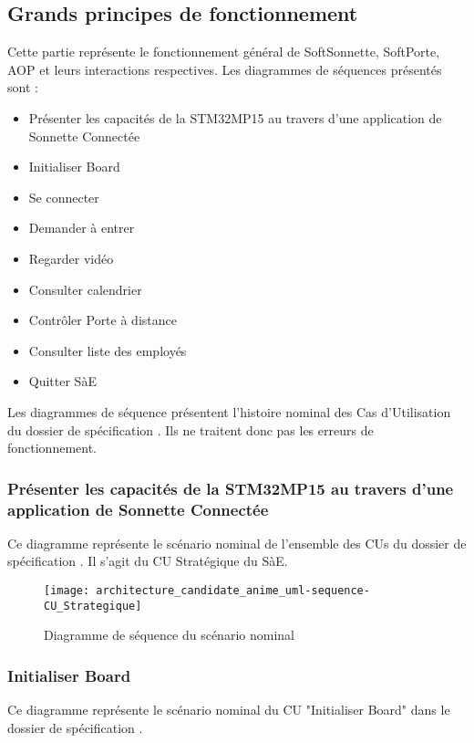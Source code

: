 \newpage

\subsection{Grands principes de fonctionnement}

Cette partie représente le fonctionnement général de SoftSonnette, SoftPorte, AOP et leurs interactions respectives.
Les diagrammes de séquences présentés sont : 
\begin {itemize}
    \item Présenter les capacités de la STM32MP15 au travers d'une application de Sonnette Connectée
    \item Initialiser Board
    \item Se connecter
    \item Demander à entrer
    \item Regarder vidéo
    \item Consulter calendrier
    \item Contrôler Porte à distance
    \item Consulter liste des employés
    \item Quitter SàE
\end {itemize}

Les diagrammes de séquence présentent l'histoire nominal des Cas d'Utilisation du dossier de spécification . 
Ils ne traitent donc pas les erreurs de fonctionnement.

\newpage

\subsubsection{Présenter les capacités de la STM32MP15 au travers d'une application de Sonnette Connectée} %
Ce diagramme représente le scénario nominal de l'ensemble des CUs du dossier de spécification .
Il s'agit du CU Stratégique du SàE.\\

\begin{figure} [H]
    \centering
    \texttt{[image: architecture\_candidate\_anime\_uml-sequence-CU\_Strategique]}
    \caption{Diagramme de séquence du scénario nominal}
    \label{CU-Stratégique}
\end{figure}

\newpage

\subsubsection{Initialiser Board} %
Ce diagramme représente le scénario nominal du CU "Initialiser Board" dans le dossier de spécification .\\

